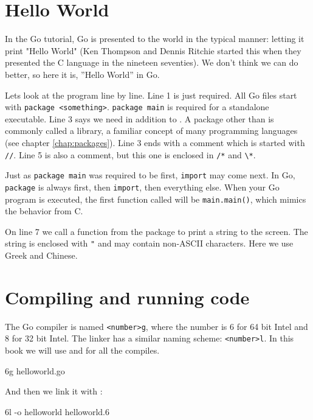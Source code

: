 \section{Hello World}
\label{sec:hello world}
In the Go tutorial, Go is presented to the world in the typical
manner: letting it print "Hello World" (Ken Thompson and
Dennis Ritchie started this when they presented the C language in 
the nineteen seventies). We don't think we can do better, so 
here it is, ''Hello World'' in Go.


Lets look at the program line by line.
Line 1 is just required.  All Go files start with \lstinline{package <something>}.
\lstinline{package main} is required for a standalone executable.  Line 3 says
we need  in addition to .  A package other than
 is commonly called a library, a familiar concept of many programming
languages (see chapter \ref{chap:packages}). 
Line 3  ends with a
comment which is started with \lstinline|//|. Line 5 is also a comment,
but this one is enclosed in \lstinline|/*| and \lstinline|\*|.

Just as \lstinline{package main} was required to be first, 
\lstinline{import} may come next. In Go, \lstinline{package} is always first, then
\lstinline{import}, then everything else.
When your Go program is executed, the first function called will be
\lstinline{main.main()}, which mimics the behavior from C.

On line 7 we call a function from the package  to print a
string to the screen. The string is enclosed with \lstinline{"} and may 
contain non-ASCII characters. Here we use Greek and Chinese.


\section{Compiling and running code}
The Go compiler is named \verb|<number>g|, where the number is 6 for 64 bit
Intel and 8 for 32 bit Intel. The linker has a similar naming scheme:
\verb|<number>l|. In this book we will use  and  for
all the compiles.
\begin{display}
\pr 6g helloworld.go		 
\end{display}
And then we link it with :
\begin{display}
\pr 6l -o helloworld helloworld.6
\end{display}

